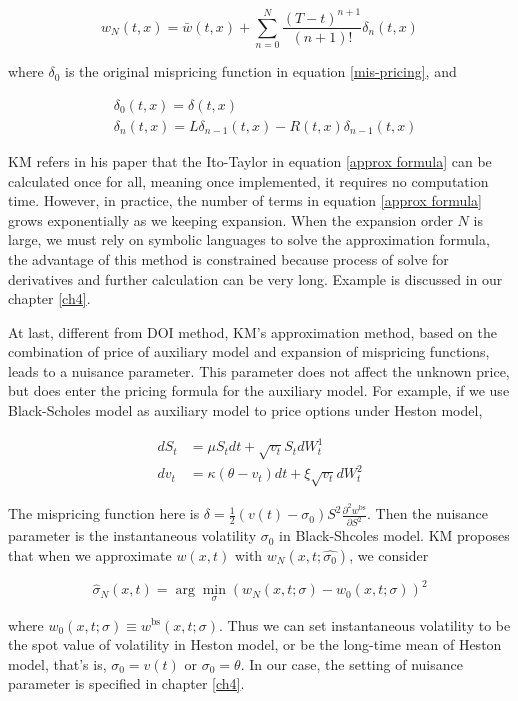 \begin{equation}\label{approx formula}
    w_{N}(t, x)=\bar{w}(t,x)+\sum_{n=0}^{N} \frac{(T-t)^{n+1}}{(n+1) !} \delta_{n}(t, x)
\end{equation}

\noindent where $\delta_0$ is the original mispricing function in equation \eqref{mis-pricing}, and

\begin{equation}
    \begin{aligned}
        &\delta_0(t,x) = \delta(t,x) \\
        &\delta_{n}(t, x)=L \delta_{n-1}(t, x)-R(t, x) \delta_{n-1}(t, x)
        \end{aligned}
\end{equation}

KM refers in his paper that the Ito-Taylor in equation \eqref{approx formula} can be calculated once for all, meaning once implemented, it requires no computation time. However, in practice, the number of terms in equation \eqref{approx formula} grows exponentially as we keeping expansion. When the expansion order $N$ is large, we must rely on symbolic languages to solve the approximation formula, the advantage of this method is constrained because process of solve for derivatives and further calculation can be very long. Example is discussed in our chapter \ref{ch4}.

At last, different from DOI method, KM's approximation method, based on the combination of price of auxiliary model and expansion of mispricing functions, leads to a nuisance parameter. This parameter does not affect the unknown price, but does enter the pricing formula for the auxiliary model. For example, if we use Black-Scholes model as auxiliary model to price options under Heston model, 

$$
\begin{aligned}
    d S_{t}&=\mu S_{t} d t+\sqrt{v_{t}} S_{t} d W_{t}^{1} \\
    d v_{t}&=\kappa\left(\theta-v_{t}\right) d t+\xi \sqrt{v_{t}} d W_{t}^{2}
\end{aligned}
$$

\noindent The mispricing function here is $\delta = \frac{1}{2}(v(t)-\sigma_0)S^2 \frac{\partial^2 w^{\text{bs}}}{\partial S^2}. $ Then the nuisance parameter is the instantaneous volatility $\sigma_0$ in Black-Shcoles model. KM proposes that when we approximate $w(x,t)$ with $w_N(x,t;\hat{\sigma_0})$, we consider

$$
\hat{\sigma}_{N}(x, t)=\arg \min _{\sigma}\left(w_{N}(x, t ; \sigma)-w_{0}(x, t ; \sigma)\right)^{2}
$$

\noindent where $w_{0}(x, t ; \sigma)\equiv w^{\text{bs}}(x, t ; \sigma)$. Thus we can set instantaneous volatility to be the spot value of volatility in Heston model, or be the long-time mean of Heston model, that's is, $\sigma_0 = v(t)$ or $\sigma_0 = \theta$. In our case, the setting of nuisance parameter is specified in chapter \ref{ch4}.